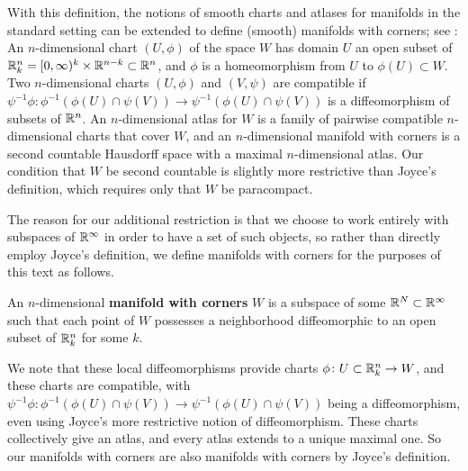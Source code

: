With this definition, the notions of smooth charts and atlases for manifolds in the standard setting can be extended to define (smooth) manifolds with corners; see \cite[Section 2]{Joy12}: An $n$-dimensional chart $(U,\phi)$ of the space $W$ has domain $U$ an open subset of $\mathbb{R}^n_k = [0,\infty)^k \times \mathbb{R}^{n-k} \subset \mathbb{R}^n$, and $\phi$ is a homeomorphism from $U$ to $\phi(U) \subset W$.
Two $n$-dimensional charts $(U,\phi)$ and $(V,\psi)$ are compatible if $\psi^{-1}\phi \colon \phi^{-1}(\phi(U) \cap \psi(V)) \to \psi^{-1}(\phi(U) \cap \psi(V))$ is a diffeomorphism of subsets of $\mathbb{R}^n$.
An $n$-dimensional atlas for $W$ is a family of pairwise compatible $n$-dimensional charts that cover $W$, and an $n$-dimensional manifold with corners is a second countable Hausdorff space with a maximal $n$-dimensional atlas.
Our condition that $W$ be second countable is slightly more restrictive than Joyce's definition, which requires only that $W$ be paracompact.

The reason for our additional restriction is that we choose to work entirely with subspaces of $\mathbb{R}^\infty$ in order to have a set of such objects, so rather than directly employ Joyce's definition, we define manifolds with corners for the purposes of this text as follows.

\begin{definition}\label{D: MWC}
	An $n$-dimensional \textbf{manifold with corners} $W$ is a subspace of some $\mathbb{R}^N \subset \mathbb{R}^\infty$ such that each point of $W$ possesses a neighborhood diffeomorphic to an open subset of $\mathbb{R}^n_k$ for some $k$.
\end{definition}

We note that these local diffeomorphisms provide charts $\phi \colon U \subset \mathbb{R}^n_k \to W$, and these charts are compatible, with $\psi^{-1}\phi \colon \phi^{-1}(\phi(U) \cap \psi(V)) \to \psi^{-1}(\phi(U) \cap \psi(V))$ being a diffeomorphism, even using Joyce's more restrictive notion of diffeomorphism.
These charts collectively give an atlas, and every atlas extends to a unique maximal one.
So our manifolds with corners are also manifolds with corners by Joyce's definition.

